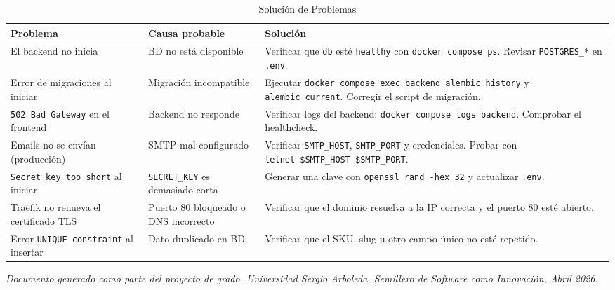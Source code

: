 \begin{longtable}[]{@{}
  >{\raggedright\arraybackslash}p{}
  >{\raggedright\arraybackslash}p{}
  >{\raggedright\arraybackslash}p{}@{}}
\caption[Solución de Problemas]{Solución de Problemas}\tabularnewline
\toprule\noalign{}
\begin{minipage}[b]{\linewidth}\raggedright
Problema
\end{minipage} & \begin{minipage}[b]{\linewidth}\raggedright
Causa probable
\end{minipage} & \begin{minipage}[b]{\linewidth}\raggedright
Solución
\end{minipage} \\
\midrule\noalign{}
\endhead
\bottomrule\noalign{}
\endlastfoot
El backend no inicia & BD no está disponible & Verificar que \texttt{db} esté \texttt{healthy} con \texttt{docker\ compose\ ps}. Revisar \texttt{POSTGRES\_*} en \texttt{.env}. \\
Error de migraciones al iniciar & Migración incompatible & Ejecutar \texttt{docker\ compose\ exec\ backend\ alembic\ history} y \texttt{alembic\ current}. Corregir el script de migración. \\
\texttt{502\ Bad\ Gateway} en el frontend & Backend no responde & Verificar logs del backend: \texttt{docker\ compose\ logs\ backend}. Comprobar el healthcheck. \\
Emails no se envían (producción) & SMTP mal configurado & Verificar \texttt{SMTP\_HOST}, \texttt{SMTP\_PORT} y credenciales. Probar con \texttt{telnet\ \$SMTP\_HOST\ \$SMTP\_PORT}. \\
\texttt{Secret\ key\ too\ short} al iniciar & \texttt{SECRET\_KEY} es demasiado corta & Generar una clave con \texttt{openssl\ rand\ -hex\ 32} y actualizar \texttt{.env}. \\
Traefik no renueva el certificado TLS & Puerto 80 bloqueado o DNS incorrecto & Verificar que el dominio resuelva a la IP correcta y el puerto 80 esté abierto. \\
Error \texttt{UNIQUE\ constraint} al insertar & Dato duplicado en BD & Verificar que el SKU, slug u otro campo único no esté repetido. \\
\end{longtable}

\emph{Documento generado como parte del proyecto de grado. Universidad Sergio Arboleda, Semillero de Software como Innovación, Abril 2026.}
